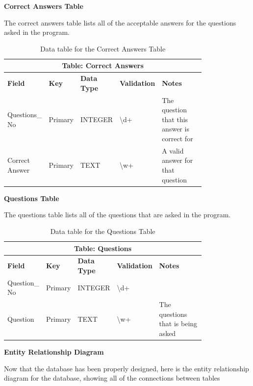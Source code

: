 \documentclass[12pt]{article}
\begin{document}
\textbf{Correct Answers Table}

The correct answers table lists all of the acceptable answers for the questions asked in the program.

\begin{table}[ht]
    \centering
    \begin{tabular}{ | p{0.15\linewidth} | p{0.1\linewidth} | p{0.16\linewidth} | p{0.14\linewidth} | p{0.25\linewidth} | }
    \hline
    \multicolumn{5}{|c|}{\textbf{Table: Correct Answers}}\\
    \hline
    \hline
    \textbf{Field} & \textbf{Key} & \textbf{Data Type} & \textbf{Validation} & \textbf{Notes} \\
    \hline
    Questions\_ No & Primary & INTEGER & \textbackslash d+ & The question that this answer is correct for\\
    \hline
    Correct \text{ } Answer & Primary & TEXT & \textbackslash w+ & A valid answer for that question\\
    \hline
    \end{tabular}
    \caption{Data table for the Correct Answers Table}
\end{table}
\clearpage

\textbf{Questions Table}

The questions table lists all of the questions that are asked in the program.

\begin{table}[ht]
    \centering
    \begin{tabular}{ | p{0.15\linewidth} | p{0.1\linewidth} | p{0.16\linewidth} | p{0.14\linewidth} | p{0.25\linewidth} | }
    \hline
    \multicolumn{5}{|c|}{\textbf{Table: Questions}}\\
    \hline
    \hline
    \textbf{Field} & \textbf{Key} & \textbf{Data Type} & \textbf{Validation} & \textbf{Notes} \\
    \hline
    Question\_ No & Primary & INTEGER & \textbackslash d+ &\\
    \hline
    Question & Primary & TEXT & \textbackslash w+ & The questions that is being asked\\
    \hline
    \end{tabular}
    \caption{Data table for the Questions Table}
\end{table}

\clearpage
\textbf{Entity Relationship Diagram}

Now that the database has been properly designed, here is the entity relationship diagram for the database, showing all of the connections between tables
\end{document}
